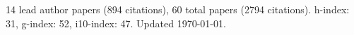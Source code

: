 14 lead author papers (894 citations),
60 total papers (2794 citations).\newline
h-index: 31, g-index: 52, i10-index: 47. Updated \today.